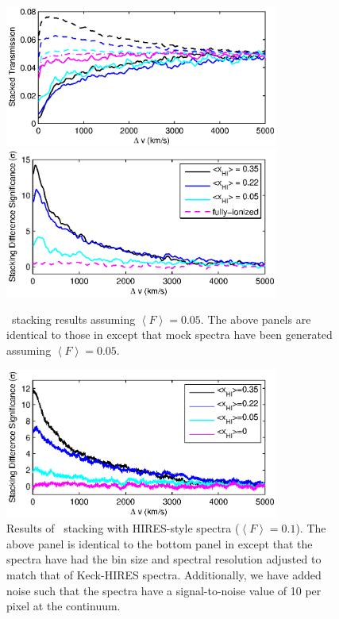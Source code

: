 \begin{figure}[!ht]
  \centering
  \includegraphics[width=9cm]{fig7a.eps}
  \includegraphics[width=9cm]{fig7b.eps}
  \caption{\lya\ stacking results assuming $\left\langle F \right\rangle = 0.05$. The above panels are identical to those in  except that mock spectra have been generated assuming $\left\langle F \right\rangle = 0.05$. }
  \label{fig:LyaResults_LowF}
\end{figure}


\begin{figure}[!ht]
  \centering
  \includegraphics[width=9cm]{fig8.eps}
  \caption{Results of \lya\ stacking with HIRES-style spectra ($\left\langle F \right\rangle = 0.1$). The above panel is identical to the bottom panel in  except that the spectra have had the bin size and spectral resolution adjusted to match that of Keck-HIRES spectra. Additionally, we have added noise such that the spectra have a signal-to-noise value of 10 per pixel at the continuum.}
  \label{fig:HIRES_LyaResults_Noisy}
\end{figure}


